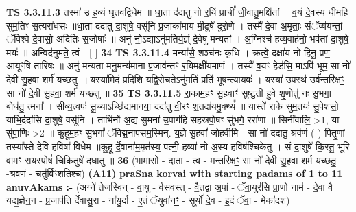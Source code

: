 \documentclass[17pt]{extarticle}
\begin{document}
                  \newline
                                \textbf{ TS 3.3.11.3} \newline
                  तस्मा॑ उ ह॒व्यं घृ॒तव॑द्विधेम ॥ धा॒ता द॑दातु नो र॒यिं प्राचीं᳚ जी॒वातु॒मक्षि॑तां । व॒यं दे॒वस्य॑ धीमहि सुम॒तिꣳ स॒त्यरा॑धसः ॥धा॒ता द॑दातु दा॒शुषे॒ वसू॑नि प्र॒जाका॑माय मी॒ढुषे॑ दुरो॒णे । तस्मै॑ दे॒वा अ॒मृताः॒ संॅव्य॑यन्तां॒ ॅविश्वे॑ दे॒वासो॒ अदि॑तिः स॒जोषाः᳚ ॥ अनु॑ नो॒ऽद्याऽनु॑मतिर्य॒ज्ञ्ं दे॒वेषु॑ मन्यतां । अ॒ग्निश्च॑ हव्य॒वाह॑नो॒ भव॑तां दा॒शुषे॒ मयः॑ ॥ अन्विद॑नुमते॒ त्वं - [  ] \textbf{  34} \newline
                  \newline
                                \textbf{ TS 3.3.11.4} \newline
                  मन्या॑सै॒ शञ्च॑नः कृधि । क्रत्वे॒ दक्षा॑य नो हिनु॒ प्रण॒ आयूꣳ॑षि तारिषः ॥ अनु॑ मन्यता-मनु॒मन्य॑माना प्र॒जाव॑न्तꣳ र॒यिमक्षी॑यमाणं । तस्यै॑ व॒यꣳ हेड॑सि॒ माऽपि॑ भूम॒ सा नो॑ दे॒वी सु॒हवा॒ शर्म॑ यच्छतु ॥ यस्या॑मि॒दं प्र॒दिशि॒ यद्वि॒रोच॒तेऽनु॑मतिं॒ प्रति॑ भूषन्त्या॒यवः॑ । यस्या॑ उ॒पस्थ॑ उ॒र्व॑न्तरि॑क्षꣳ॒॒ सा नो॑ दे॒वी सु॒हवा॒ शर्म॑ यच्छतु ॥ \textbf{  35} \newline
                  \newline
                                \textbf{ TS 3.3.11.5} \newline
                  रा॒काम॒हꣳ सु॒हवाꣳ॑ सुष्टु॒ती हु॑वे शृ॒णोतु॑ नः सु॒भगा॒ बोध॑तु॒ त्मना᳚ । सीव्य॒त्वपः॑ सू॒च्याऽच्छि॑द्यमानया॒ ददा॑तु वी॒रꣳ श॒तदा॑यमु॒क्थ्यं᳚ ॥ यास्ते॑ राके सुम॒तयः॑ सु॒पेश॑सो॒ याभि॒र्ददा॑सि दा॒शुषे॒ वसू॑नि । ताभि॑र्नो अ॒द्य सु॒मना॑ उ॒पाग॑हि सहस्रपो॒षꣳ सु॑भगे॒ ररा॑णा ॥ सिनी॑वालि॒ >1, या सु॑पा॒णिः >2 ॥ कु॒हूम॒हꣳ सु॒भगां᳚ ॅविद्म॒नाप॑सम॒स्मिन्. य॒ज्ञे सु॒हवां᳚ जोहवीमि ।सा नो॑ ददातु॒ श्रव॑णं ( ) पितृ॒णां तस्या᳚स्ते देवि ह॒विषा॑ विधेम ॥कु॒हू-र्दे॒वाना॑म॒मृत॑स्य॒ पत्नी॒ हव्या॑ नो अ॒स्य ह॒विष॑श्चिकेतु । सं दा॒शुषे॑ कि॒रतु॒ भूरि॑ वा॒मꣳ रा॒यस्पोषं॑ चिकि॒तुषे॑ दधातु ॥ \textbf{  36} \newline
                  \newline
                      (भामा॑सो॒ - दाता॒ - त्व - म॒न्तरि॑क्षꣳ॒॒ सा नो॑ दे॒वी सु॒हवा॒ शर्म॑ यच्छतु॒ -श्रव॑णं॒ - चतु॑र्विꣳशतिश्च)  \textbf{(A11)} \newline \newline
                \textbf{praSna korvai with starting padams of 1 to 11 anuvAkams :-} \newline
        (अग्ने॑ तेजस्विन् - वा॒यु - र्वस॑वस्त् - वै॒तद्वा अ॒पां - ॅवा॒युर॑सि प्रा॒णो नाम॑ - दे॒वा वै यद्य॒ज्ञेन॒न - प्र॒जाप॑ति र्देवासु॒रा - ना॑यु॒र्दा - ए॒तं ॅयुवा॑नꣳ॒॒ - सूर्यो॑ दे॒व - इ॒दं ॅवा॒ - मेका॑दश) \newline
\end{document}
